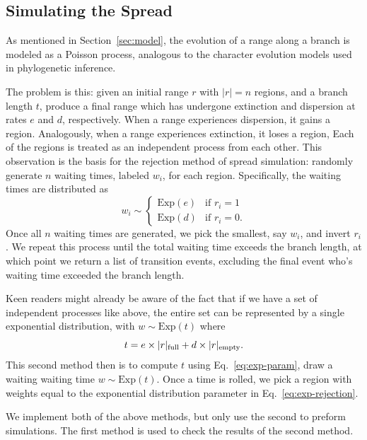 \documentclass{article}
\begin{document}
\subsection{Simulating the Spread}

As mentioned in Section~\ref{sec:model}, the evolution of a range along a
branch is modeled as a Poisson process, analogous to the character evolution
models used in phylogenetic inference.

The problem is this: given an initial range \( r \) with \( |r| = n \) regions,
and a branch length \( t \), produce a final range which has undergone
extinction and dispersion at rates \( e \) and \( d \), respectively.
When a range experiences dispersion, it gains a region.
Analogously, when a range experiences extinction, it loses a region, Each of
the regions is treated as an independent process from each other.
This observation is the basis for the rejection method of spread simulation:
randomly generate \( n \) waiting times, labeled \( w_i \), for each region.
Specifically, the waiting times are distributed as
\begin{equation}
	\label{eq:exp-rejection} w_i \sim
	\begin{cases}
		\text{Exp}(e) & \text{if } r_i
		= 1                            \\ \text{Exp}(d) & \text{if } r_i = 0.
	\end{cases}
\end{equation}
Once all $n$ waiting times are generated, we pick the smallest, say $w_i$, and
invert $r_i$.
We repeat this process until the total waiting time exceeds the branch length,
at which point we return a list of transition events, excluding the final event
who's waiting time exceeded the branch length.

Keen readers might already be aware of the fact that if we have a set of
independent processes like above, the entire set can be represented by a single
exponential distribution, with \(w \sim \text{Exp}(t) \) where
\begin{equation}
	\label{eq:exp-param} t = e \times |r|_\text{full} + d \times |r|_\text{empty}.
\end{equation}
This second method then is to compute \( t \) using Eq.~\ref{eq:exp-param},
draw a waiting waiting time \( w \sim \text{Exp}(t) \).
Once a time is rolled, we pick a region with weights equal to the exponential
distribution parameter in Eq.~\ref{eq:exp-rejection}.

We implement both of the above methods, but only use the second to preform
simulations.
The first method is used to check the results of the second method.
\end{document}
